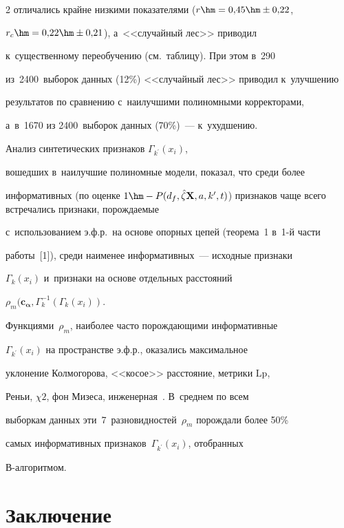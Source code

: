 \begin{multicols}{2}
отличались крайне низкими показателями ($r\hm=0{,}45\hm\pm0{,}22$, 

$r_c\hm=0{,}22\hm\pm0{,}21$), а~<<случайный лес>> приводил 

к~существенному переобучению (см.\ таб\-ли\-цу). При этом в~290 

из~2400~выборок данных (12\%) <<случайный лес>> приводил к~улучшению 

результатов по сравнению с~наилучшими полиномными корректорами, 

а~в~1670 из 2400~выборок данных (70\%)~--- к~ухудшению.

     

     

     Анализ синтетических признаков $\Gamma_{k^\prime}(x_i)$, 

вошедших в~наилучшие полиномные модели, показал, что среди более 

информативных (по оценке $1\hm- P(d_f, \hat{\zeta}\mathbf{X},  

a, k^\prime, t)$) признаков чаще всего встречались признаки, порождаемые 

с~использованием э.ф.р.\ на основе опорных цепей (теорема~1 в~1-й части 

работы~[1]), среди наименее информативных~--- исходные признаки 

$\Gamma_k(x_i)$ и~признаки на основе отдельных расстояний 

$\rho_m(\mathbf{c}_{\bm{\alpha}} , \Gamma_k^{-1}(\Gamma_k(x_i))$. 

Функциями~$\rho_m$, наиболее часто порождающими информативные 

$\Gamma_{k^\prime}(x_i)$ на пространстве э.ф.р., оказались максимальное 

уклонение Колмогорова, <<косое>> расстояние, метрики $\mathrm{Lp}$, 

Реньи, $\chi2$, фон Мизеса, инженерная~\cite{2-tor}. В~среднем по всем 

выборкам данных эти~7~разновидностей~$\rho_m$ порождали более 50\% 

самых информативных признаков~$\Gamma_{k^\prime}(x_i)$, отобранных  

В-ал\-го\-рит\-мом.



\vspace*{-6pt}



\section{Заключение}




\end{multicols}
